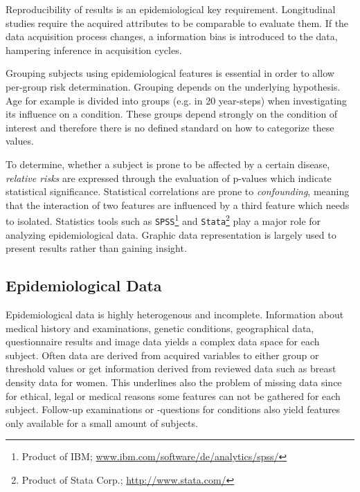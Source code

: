 \documentclass[journal]{style/vgtc} 			          %
\begin{document}
Reproducibility of results is an epidemiological key requirement.
%
Longitudinal studies require the acquired attributes to be comparable to evaluate them.
%
If the data acquisition process changes, a information bias is introduced to the data, hampering inference in acquisition cycles.
%

Grouping subjects using epidemiological features is essential in order to allow per-group risk determination.
%
Grouping depends on the underlying hypothesis.
%
Age for example is divided into groups (e.g. in 20 year-steps) when investigating its influence on a condition.
%
These groups depend strongly on the condition of interest and therefore there is no defined standard on how to categorize these values.

To determine, whether a subject is prone to be affected by a certain disease, \emph{relative risks} are expressed through the evaluation of p-values which indicate statistical significance.
%
Statistical correlations are prone to \emph{confounding}, meaning that the interaction of two features are influenced by a third feature which needs to isolated.
%
Statistics tools such as \texttt{SPSS}\footnote{Product of IBM; \url{www.ibm.com/software/de/analytics/spss/}} and \texttt{Stata}\footnote{Product of Stata Corp.; \url{http://www.stata.com/}} play a major role for analyzing epidemiological data.
%
Graphic data representation is largely used to present results rather than gaining insight.
	
\subsection{Epidemiological Data} \label{EpidemiologicalData}
Epidemiological data is highly heterogenous and incomplete.
%
Information about medical history and examinations, genetic conditions, geographical data, questionnaire results and image data yields a complex data space for each subject.
%
Often data are derived from acquired variables to either group or threshold values or get information derived from reviewed data such as breast density data for women.
%
This underlines also the problem of missing data since for ethical, legal or medical reasons some features can not be gathered for each subject.
%
Follow-up examinations or -questions for conditions also yield features only available for a small amount of subjects.
%
\end{document}
